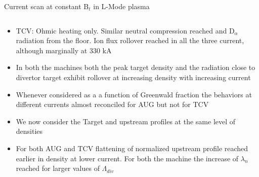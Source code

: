 \documentclass[10pt, compress]{beamer}
\begin{document}
\begin{frame}{Current scan at constant B$_t$ in L-Mode plasma}
\begin{columns}
\begin{column}{0.4\textwidth}
\begin{itemize}
          avoid earlier disruption. Similar neutral pressure in the
          subdivertor region reached. NBI additional power added to
          keep power in the SOL approximately constant
        \item<3|only@3> TCV: Ohmic heating only. Similar neutral compression reached and
          D$_{\alpha}$ radiation from the floor. Ion flux rollover
          reached in all the three current,  although marginally at
          330 kA
        \item<4|only@4> In both the machines both the peak target
          density and the radiation close to divertor target exhibit
          rollover at increasing density with increasing current
        \item<5|only@5> Whenever considered as a a function of
          Greenwald fraction the behaviors at different currents
          almost reconciled for AUG \alert{but not for TCV}
        \item<6|only@6> We now consider the Target and upstream
          profiles at the same level of densities
        \item<7|only@7> For both AUG and TCV flattening of normalized
          upstream profile reached \alert{earlier in density at lower
            current.} For both the machine the increase of $\lambda_n$
          reached for larger values of $\Lambda_{div}$
      \end{itemize}
    \end{column}
  \end{columns}
\end{frame}  
\end{document}
